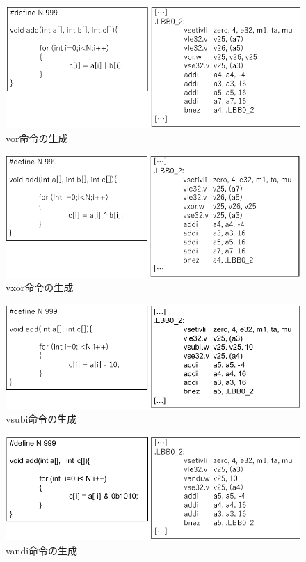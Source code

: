 \begin{figure}
    \centering
    \includegraphics[scale=0.8]{image/vor.pdf}
    \caption{vor命令の生成}
    \label{fig:vor}
\end{figure}

\begin{figure}
    \centering
    \includegraphics[scale=0.8]{image/vxor.pdf}
    \caption{vxor命令の生成}
    \label{fig:vxor}
\end{figure}

\begin{figure}
    \centering
    \includegraphics[scale=0.8]{image/vsubi.pdf}
    \caption{vsubi命令の生成}
    \label{fig:vsubi}
\end{figure}

\begin{figure}
    \centering
    \includegraphics[scale=0.8]{image/vandi.pdf}
    \caption{vandi命令の生成}
    \label{fig:vandi}
\end{figure}

